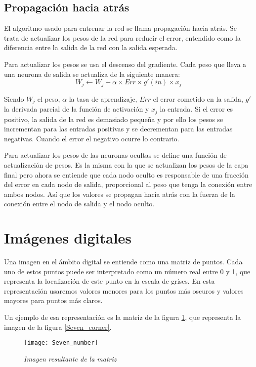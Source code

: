 \subsection{Propagación hacia atrás}

El algoritmo usado para entrenar la red se llama propagación hacia atrás. Se
trata de actualizar los pesos de la red para reducir el error, entendido como
la diferencia entre la salida de la red con la salida esperada.

Para actualizar los pesos se usa el descenso del gradiente. Cada peso que lleva
a una neurona de salida se actualiza de la siguiente manera: 
\[
    W_j \leftarrow W_j + \alpha \times Err \times g'(in) \times x_j
\]

Siendo $W_j$ el peso, $\alpha$ la tasa de aprendizaje, $Err$ el error cometido
en la salida, $g'$ la derivada parcial de la función de activación y $x_j$ la
entrada. Si el error es positivo, la salida de la red es demasiado pequeña y por
ello los pesos se incrementan para las entradas positivas y se decrementan para
las entradas negativas. Cuando el error el negativo ocurre lo contrario.

Para actualizar los pesos de las neuronas ocultas se define una función de
actualización de pesos. Es la misma con la que se actualizan los pesos de la
capa final pero ahora se entiende que cada nodo oculto es responsable de una
fracción del error en cada nodo de salida, proporcional al peso que tenga la
conexión entre ambos nodos. Así que los valores se propagan hacia atrás con la
fuerza de la conexión entre el nodo de salida y el nodo oculto.

\section{Imágenes digitales}

Una imagen en el ámbito digital se entiende como una matriz de puntos.
Cada uno de estos puntos puede ser interpretado como un número real entre 0 y 1, que representa la localización de este punto en la escala de grises. En esta representación usaremos valores menores para los puntos más oscuros y valores mayores para puntos más claros.

Un ejemplo de esa representación es la matriz de la figura \ref{Seven_number}, que representa la imagen de la figura \ref{Seven_corner}.

\begin{figure}
    \centering
    \caption{\textit{Imagen resultante de la matriz}}
  \label{Seven_number}
  \texttt{[image: Seven\_number]}
\end{figure}

